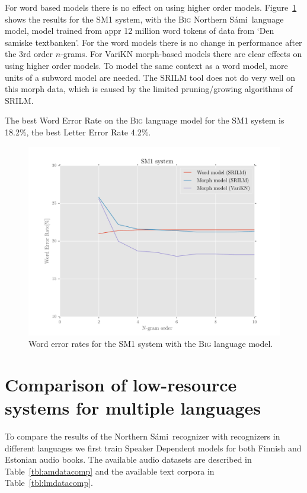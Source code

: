 \documentclass[b5paper]{article}
\newcommand{\ns}{Northern Sámi}
\newcommand{\ngram}{$n$-gram}
\newcommand{\ds}[1]{\textsc{#1}}
\begin{document}
For word based models there is no effect on using higher order models. Figure~\ref{fig:samiperf} shows the results for the SM1 system, with the \ds{Big} \ns\ language model, model trained from appr 12 million word tokens of data from `Den samiske textbanken'. For the word models there is no change in performance after the 3rd order \ngram s. For VariKN morph-based models there are clear effects on using higher order models. To model the same context as a word model, more units of a subword model are needed. The SRILM tool does not do very well on this morph data, which is caused by the limited pruning/growing algorithms of SRILM.

The best Word Error Rate on the \ds{Big} language model for the SM1 system is 18.2\%, the best Letter Error Rate 4.2\%. 

\begin{figure}
\centering
\includegraphics[width=\textwidth]{figures/sme1}
\caption{Word error rates for the SM1 system with the \ds{Big} language model.}\label{fig:samiperf}

\end{figure}





\section{Comparison of low-resource systems for multiple languages}
\label{sec:compexp}
To compare the results of the \ns\ recognizer with recognizers in different languages we first train Speaker Dependent models for both Finnish and Estonian audio books. The available audio datasets are described in Table~\ref{tbl:amdatacomp} and the available text corpora in Table~\ref{tbl:lmdatacomp}.
\end{document}
